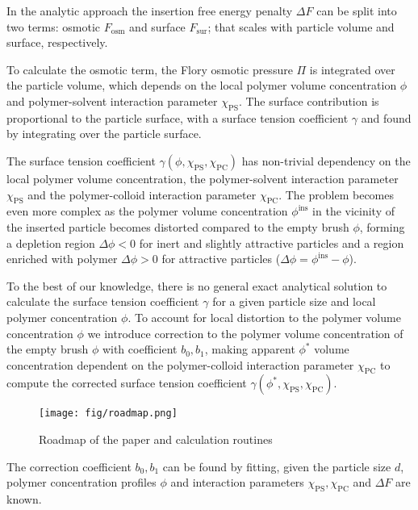 \documentclass[10pt, a4paper]{article}
\begin{document}
\begin{multicols}{2}
In the analytic approach the insertion free energy penalty $\Delta F$ can be split into two terms: osmotic $F_{\textrm{osm}}$ and surface $F_{\textrm{sur}}$; that scales with particle volume and surface, respectively.

To calculate the osmotic term, the Flory osmotic pressure $\Pi$ is integrated over the particle volume, which depends on the local polymer volume concentration $\phi$ and polymer-solvent interaction parameter $\chi_{\textrm{PS}}$.
The surface contribution is proportional to the particle surface, with a surface tension coefficient $\gamma$ and found by integrating over the particle surface.

The surface tension coefficient $\gamma(\phi, \chi_{\textrm{PS}}, \chi_{\textrm{PC}})$ has non-trivial dependency on the local polymer volume concentration, the polymer-solvent interaction parameter $\chi_{\textrm{PS}}$ and the polymer-colloid interaction parameter $\chi_{\textrm{PC}}$.
The problem becomes even more complex as the polymer volume concentration $\phi^{\textrm{ins}}$ in the vicinity of the inserted particle becomes distorted compared to the empty brush $\phi$, forming a depletion region $\Delta \phi <0$ for inert and slightly attractive particles and a region enriched with polymer $\Delta \phi >0$ for attractive particles ($\Delta \phi = \phi^{\textrm{ins}} - \phi$).

To the best of our knowledge, there is no general exact analytical solution to calculate the surface tension coefficient $\gamma$ for a given particle size and local polymer concentration $\phi$.
To account for local distortion to the polymer volume concentration $\phi$ we introduce correction to the polymer volume concentration of the empty brush $\phi$ with coefficient $b_0, b_1$, making apparent $\phi^{\ast}$ volume concentration dependent on the polymer-colloid interaction parameter $\chi_{\textrm{PC}}$ to compute the corrected surface tension coefficient $\gamma(\phi^{\ast},\chi_{\textrm{PS}}, \chi_{\textrm{PC}})$.

\begin{figure}[H]
    \texttt{[image: fig/roadmap.png]}
    \caption{Roadmap of the paper and calculation routines}
    \label{fig:paper_roadmap}
\end{figure}

The correction coefficient $b_0, b_1$ can be found by fitting, given the particle size $d$, polymer concentration profiles $\phi$ and interaction parameters $\chi_{\textrm{PS}}, \chi_{\textrm{PC}}$ and $\Delta F$ are known.



\end{multicols}
\end{document}
